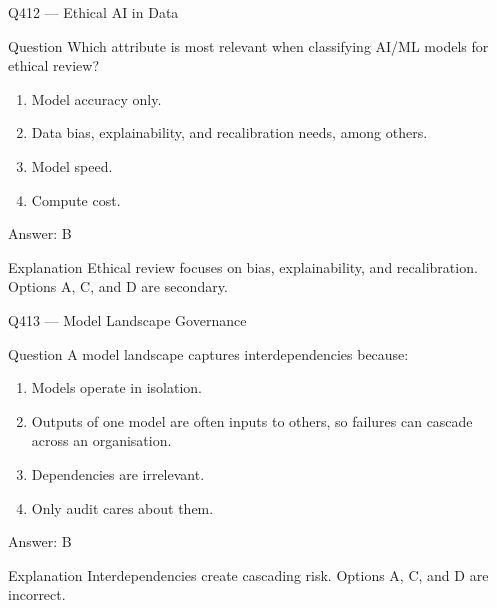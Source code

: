 \documentclass[aspectratio=169,8pt]{beamer}
\begin{document}
	\begin{frame}{Q412 --- Ethical AI in Data}
		\begin{block}{Question}
			Which attribute is most relevant when classifying AI/ML models for ethical review?
			\begin{enumerate}
				\item Model accuracy only.
				\item Data bias, explainability, and recalibration needs, among others.
				\item Model speed.
				\item Compute cost.
			\end{enumerate}
		\end{block}
		\begin{exampleblock}{Answer: B}\end{exampleblock}
		\begin{block}{Explanation}
			Ethical review focuses on bias, explainability, and recalibration. Options A, C, and D are secondary.
		\end{block}
	\end{frame}
	
	\begin{frame}{Q413 --- Model Landscape Governance}
		\begin{block}{Question}
			A model landscape captures interdependencies because:
			\begin{enumerate}
				\item Models operate in isolation.
				\item Outputs of one model are often inputs to others, so failures can cascade across an organisation.
				\item Dependencies are irrelevant.
				\item Only audit cares about them.
			\end{enumerate}
		\end{block}
		\begin{exampleblock}{Answer: B}\end{exampleblock}
		\begin{block}{Explanation}
			Interdependencies create cascading risk. Options A, C, and D are incorrect.
		\end{block}
	\end{frame}
	
\end{document}
